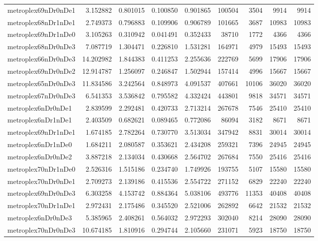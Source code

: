 \begin{longtable}{|l|r|r|r|r|r|r|r|r|}
metroplex69nDr0nDe1 & 3.152882 & 0.801015 & 0.100850 & 0.901865 & 100504 & 3504 & 9914 & 9914 \\
metroplex68nDr1nDe1 & 2.749373 & 0.796883 & 0.109906 & 0.906789 & 101665 & 3687 & 10983 & 10983 \\
metroplex69nDr1nDe0 & 3.105263 & 0.310942 & 0.041491 & 0.352433 & 38710 & 1772 & 4366 & 4366 \\
metroplex68nDr0nDe3 & 7.087719 & 1.304471 & 0.226810 & 1.531281 & 164971 & 4979 & 15493 & 15493 \\
metroplex66nDr0nDe3 & 14.202982 & 1.844383 & 0.411253 & 2.255636 & 222769 & 5699 & 17906 & 17906 \\
metroplex69nDr0nDe2 & 12.914787 & 1.256097 & 0.246847 & 1.502944 & 157414 & 4996 & 15667 & 15667 \\
metroplex65nDr0nDe3 & 11.834586 & 3.242564 & 0.848973 & 4.091537 & 407661 & 10106 & 36020 & 36020 \\
metroplex67nDr0nDe3 & 6.541353 & 3.536842 & 0.795582 & 4.332424 & 443801 & 9818 & 34571 & 34571 \\
metroplex6nDr0nDe1 & 2.839599 & 2.292481 & 0.420733 & 2.713214 & 267678 & 7546 & 25410 & 25410 \\
metroplex6nDr1nDe1 & 2.403509 & 0.682621 & 0.089465 & 0.772086 & 86094 & 3182 & 8671 & 8671 \\
metroplex69nDr1nDe1 & 1.674185 & 2.782264 & 0.730770 & 3.513034 & 347942 & 8831 & 30014 & 30014 \\
metroplex6nDr1nDe0 & 1.684211 & 2.080587 & 0.353621 & 2.434208 & 259321 & 7396 & 24945 & 24945 \\
metroplex6nDr0nDe2 & 3.887218 & 2.134034 & 0.430668 & 2.564702 & 267684 & 7550 & 25416 & 25416 \\
metroplex70nDr1nDe0 & 2.526316 & 1.515186 & 0.234740 & 1.749926 & 193755 & 5107 & 15580 & 15580 \\
metroplex70nDr0nDe1 & 2.709273 & 2.139186 & 0.415536 & 2.554722 & 271152 & 6829 & 22240 & 22240 \\
metroplex69nDr0nDe3 & 6.303258 & 4.153742 & 0.884364 & 5.038106 & 493776 & 11353 & 40408 & 40408 \\
metroplex70nDr1nDe1 & 2.972431 & 2.175486 & 0.345520 & 2.521006 & 262892 & 6642 & 21532 & 21532 \\
metroplex6nDr0nDe3 & 5.385965 & 2.408261 & 0.564032 & 2.972293 & 302040 & 8214 & 28090 & 28090 \\
metroplex70nDr0nDe3 & 10.674185 & 1.810916 & 0.294744 & 2.105660 & 231071 & 5923 & 18750 & 18750 \\

\end{longtable}
